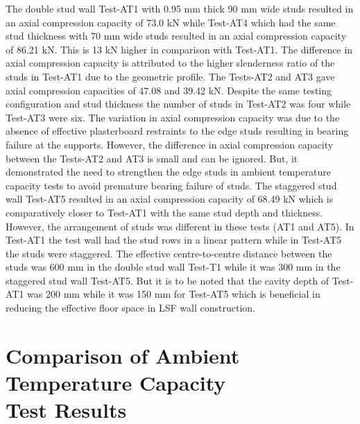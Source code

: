 The double stud wall Test-AT1 with 0.95 mm thick 90 mm wide studs resulted in an axial compression capacity of 73.0 kN while Test-AT4 which had the same stud thickness with 70 mm wide studs resulted in an axial compression capacity of 86.21 kN. This is 13 kN higher in comparison with Test-AT1. The difference in axial compression capacity is attributed to the higher slenderness ratio of the studs in Test-AT1 due to the geometric profile. The Tests-AT2 and AT3 gave axial compression capacities of 47.08 and 39.42 kN. Despite the same testing configuration and stud thickness the number of studs in Test-AT2 was four while Test-AT3 were six. The variation in axial compression capacity was due to the absence of effective plasterboard restraints to the edge studs resulting in bearing failure at the supports. However, the difference in axial compression capacity between the Tests-AT2 and AT3 is small and can be ignored. But, it demonstrated the need to strengthen the edge studs in ambient temperature capacity tests to avoid premature bearing failure of studs. The staggered stud wall Test-AT5 resulted in an axial compression capacity of 68.49 kN which is comparatively closer to Test-AT1 with the same stud depth and thickness. However, the arrangement of studs was different in these tests (AT1 and AT5). In Test-AT1 the test wall had the stud rows in a linear pattern while in Test-AT5 the studs were staggered. The effective centre-to-centre distance between the studs was 600 mm in the double stud wall Test-T1 while it was 300 mm in the staggered stud wall Test-AT5. But it is to be noted that the cavity depth of Test-AT1 was 200 mm while it was 150 mm for Test-AT5 which is beneficial in reducing the effective floor space in LSF wall construction.

\section[Comparison of Ambient Temperature Capacity Test Results]{Comparison of Ambient Temperature Capacity \\Test Results}

